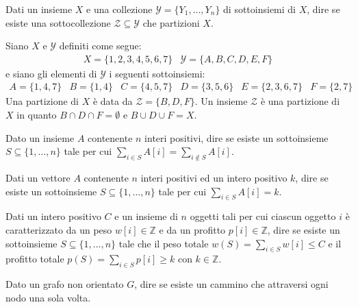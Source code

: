 \begin{problem}
    Dati un insieme $X$ e una collezione $\mathcal{Y}=\{Y_1,\dots,Y_n\}$ di
    sottoinsiemi di $X$, dire se esiste una sottocollezione $\mathcal{Z}\subseteq
    \mathcal{Y}$ che partizioni $X$.
\end{problem}
\begin{eg}
    Siano $X$ e $\mathcal{Y}$ definiti come segue:
    \[\begin{array}{lr}
        X=\{1,2,3,4,5,6,7\} & \mathcal{Y}=\{A,B,C,D,E,F\}
    \end{array}\]
    e siano gli elementi di $\mathcal{Y}$ i seguenti sottoinsiemi:
    \[\begin{array}{llllll}
        A=\{1,4,7\} & B=\{1,4\} & C=\{4,5,7\} & 
        D=\{3,5,6\} & E=\{2,3,6,7\} & F=\{2,7\}
    \end{array}\]
    Una partizione di $X$ è data da $\mathcal{Z}=\{B,D,F\}$. Un insieme
    $\mathcal{Z}$ è una partizione di $X$ in quanto $B\cap D\cap F=\emptyset$ e
    $B\cup D\cup F=X$.
\end{eg}

\begin{problem}
    Dato un insieme $A$ contenente $n$ interi positivi, dire se esiste un
    sottoinsieme $S\subseteq\{1,\dots,n\}$ tale per cui $\sum_{i\in S}A[i]=
    \sum_{i\notin S}A[i]$.
\end{problem}

\begin{problem}
    Dati un vettore $A$ contenente $n$ interi positivi ed un intero positivo $k$,
    dire se esiste un sottoinsieme $S\subseteq\{1,\dots,n\}$ tale per cui
    $\sum_{i\in S}A[i]=k$.
\end{problem}

\begin{problem}
    Dati un intero positivo $C$ e un insieme di $n$ oggetti tali per cui
    ciascun oggetto $i$ è caratterizzato da un peso $w[i]\in\mathbb{Z}$ e da un
    profitto $p[i]\in\mathbb{Z}$, dire se esiste un sottoinsieme $S\subseteq
    \{1,\dots,n\}$ tale che il peso totale $w(S)=\sum_{i\in S}w[i]\leq C$ e il
    profitto totale $p(S)=\sum_{i\in S}p[i]\geq k$ con $k\in\mathbb{Z}$.
\end{problem}

\begin{problem}
    Dato un grafo non orientato $G$, dire se esiste un cammino che attraversi
    ogni nodo una sola volta.
\end{problem}